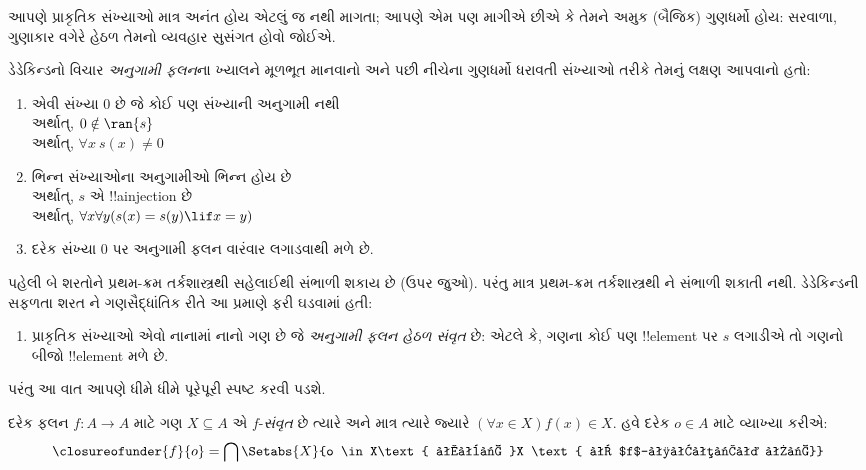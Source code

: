 \documentclass[../../../include/open-logic-section]{subfiles}
\begin{document}

આપણે પ્રાકૃતિક સંખ્યાઓ માત્ર અનંત હોય એટલું જ નથી માગતા; આપણે એમ પણ
માગીએ છીએ કે તેમને અમુક (બૈજિક) ગુણધર્મો હોય: સરવાળા, ગુણાકાર વગેરે
હેઠળ તેમનો વ્યવહાર સુસંગત હોવો જોઈએ.

ડેડેકિન્ડનો વિચાર \emph{અનુગામી ફલન}ના ખ્યાલને મૂળભૂત માનવાનો અને
પછી નીચેના ગુણધર્મો ધરાવતી સંખ્યાઓ તરીકે તેમનું લક્ષણ આપવાનો હતો:
\begin{enumerate}
	\item એવી સંખ્યા $0$ છે જે કોઈ પણ સંખ્યાની અનુગામી નથી
	\\અર્થાત્, $0 \notin \ran{s}$
	\\અર્થાત્, $\forall x\ s(x) \neq 0$
	\item ભિન્ન સંખ્યાઓના અનુગામીઓ ભિન્ન હોય છે
	\\અર્થાત્, $s$ એ !!a{injection} છે
	\\અર્થાત્, $\forall x \forall y (s(x) = s(y) \lif x = y)$
	\item{} દરેક સંખ્યા $0$ પર અનુગામી
	ફલન વારંવાર લગાડવાથી મળે છે.
\end{enumerate}
પહેલી બે શરતોને પ્રથમ-ક્રમ તર્કશાસ્ત્રથી સહેલાઈથી સંભાળી શકાય છે
(ઉપર જુઓ). પરંતુ માત્ર પ્રથમ-ક્રમ તર્કશાસ્ત્રથી
ને સંભાળી શકાતી નથી. ડેડેકિન્ડની સફળતા
શરત ને ગણસૈદ્ધાંતિક રીતે આ પ્રમાણે ફરી
ઘડવામાં હતી:
\begin{enumerate}
	\item[3$'$.] પ્રાકૃતિક સંખ્યાઓ એવો નાનામાં નાનો ગણ છે જે
	\emph{અનુગામી ફલન હેઠળ સંવૃત} છે: એટલે કે, ગણના કોઈ પણ
	!!{element} પર $s$ લગાડીએ તો ગણનો બીજો !!{element} મળે છે.
\end{enumerate}
પરંતુ આ વાત આપણે ધીમે ધીમે પૂરેપૂરી સ્પષ્ટ કરવી પડશે.

\begin{defn}
	દરેક ફલન $f \colon A \to A$ માટે ગણ $X \subseteq A$ એ
	$f$-\emph{સંવૃત} છે ત્યારે અને માત્ર ત્યારે જ્યારે $(\forall x \in X)f(x) \in X$.
	હવે દરેક $o \in A$ માટે વ્યાખ્યા કરીએ:
	$$\closureofunder{f}{o} = \bigcap\Setabs{X}{o \in X\text{ અને }X
\text{ એ $f$-સંવૃત છે}}$$
\end{defn}
\end{document}
